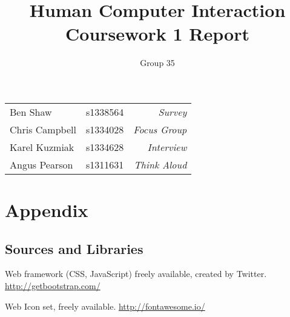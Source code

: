 \documentclass[a4paper, notoc]{tufte-handout}
\title{Human Computer Interaction\\ Coursework 1 Report}
\author{Group 35}
\let\origdescription\description
\renewenvironment{description}{
  \setlength{\leftmargini}{0em}
  \origdescription
  \setlength{\itemindent}{0em}
  \setlength{\labelsep}{\textwidth}
}
{\endlist}
\begin{document}
\maketitle %
\vspace{1em}
\noindent
\begin{tabular}{l l r}
  Ben Shaw       & s1338564 & \textit{Survey}\\
  Chris Campbell & s1334028 & \textit{Focus Group}\\
  Karel Kuzmiak  & s1334628 & \textit{Interview}\\
  Angus Pearson  & s1311631 & \textit{Think Aloud}\\
\end{tabular}

\tableofcontents
\newpage

%







\newpage
\section*{\textbf{Appendix}}

\subsection*{Sources and Libraries}

\begin{description}

\item[BootStrap]
Web framework (CSS, JavaScript) freely available, created by Twitter.
\href{http://getbootstrap.com/}{http://getbootstrap.com/}

\item[FontAwesome]
Web Icon set, freely available.
\href{http://fontawesome.io/}{http://fontawesome.io/}


\end{description}

%
%
\end{document}
